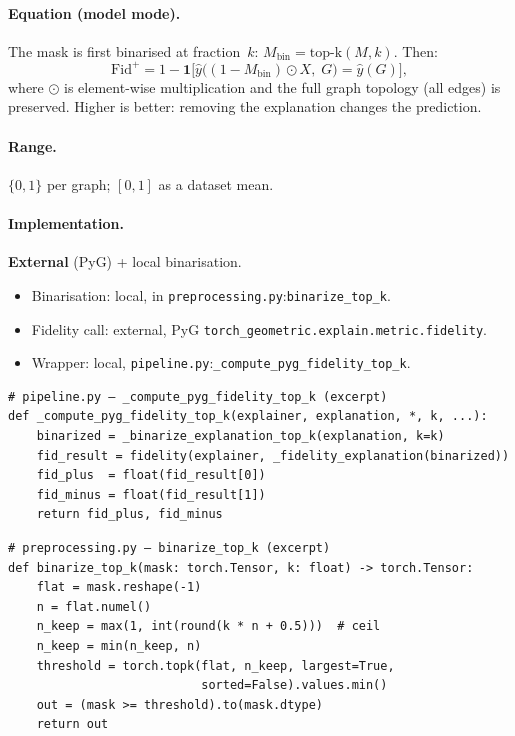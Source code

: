 \documentclass[11pt,a4paper]{article}
\newcommand{\code}[1]{\texttt{#1}}
\begin{document}
\paragraph{Equation (model mode).}
The mask is first binarised at fraction~$k$:
$M_{\mathrm{bin}} = \mathrm{top\text{-}k}(M, k)$.  Then:
\begin{equation}
  \mathrm{Fid}^{+} = 1 - \mathbf{1}\bigl[\hat{y}\bigl(
    (1 - M_{\mathrm{bin}}) \odot X,\; G\bigr) = \hat{y}(G)\bigr],
  \label{eq:fidplus}
\end{equation}
where $\odot$ is element-wise multiplication and the full graph topology
(all edges) is preserved.  Higher is better: removing the explanation
changes the prediction.

\paragraph{Range.} $\{0, 1\}$ per graph; $[0,1]$ as a dataset mean.

\paragraph{Implementation.} \textbf{External} (PyG) +
local binarisation.
\begin{itemize}[nosep]
  \item Binarisation: local, in
        \code{preprocessing.py}:\code{binarize\_top\_k}.
  \item Fidelity call: external, PyG
        \code{torch\_geometric.explain.metric.fidelity}.
  \item Wrapper: local, \code{pipeline.py}:\code{\_compute\_pyg\_fidelity\_top\_k}.
\end{itemize}

\begin{verbatim}
# pipeline.py — _compute_pyg_fidelity_top_k (excerpt)
def _compute_pyg_fidelity_top_k(explainer, explanation, *, k, ...):
    binarized = _binarize_explanation_top_k(explanation, k=k)
    fid_result = fidelity(explainer, _fidelity_explanation(binarized))
    fid_plus  = float(fid_result[0])
    fid_minus = float(fid_result[1])
    return fid_plus, fid_minus
\end{verbatim}

\begin{verbatim}
# preprocessing.py — binarize_top_k (excerpt)
def binarize_top_k(mask: torch.Tensor, k: float) -> torch.Tensor:
    flat = mask.reshape(-1)
    n = flat.numel()
    n_keep = max(1, int(round(k * n + 0.5)))  # ceil
    n_keep = min(n_keep, n)
    threshold = torch.topk(flat, n_keep, largest=True,
                           sorted=False).values.min()
    out = (mask >= threshold).to(mask.dtype)
    return out
\end{verbatim}
\end{document}
